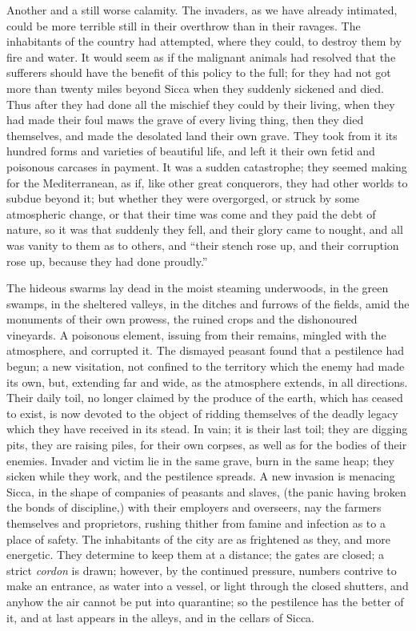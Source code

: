 Another and a still worse calamity. The invaders, as we have
already intimated, could be more terrible still in their overthrow
than in their ravages. The inhabitants of the country had attempted,
where they could, to destroy them by fire and water. It would
seem as if the malignant animals had resolved that the sufferers
should have the benefit of this policy to the full; for they had not
got more than twenty miles beyond Sicca when they suddenly sickened
and died. Thus after they had done all the mischief they could by
their living, when they had made their foul maws the grave of every
living thing, then they died themselves, and made the desolated land
their own grave. They took from it its hundred forms and varieties of
beautiful life, and left it their own fetid and poisonous carcases in
payment. It was a sudden catastrophe; they seemed making for the
Mediterranean, as if, like other great conquerors, they had other
worlds to subdue beyond it; but whether they were overgorged, or
struck by some atmospheric change, or that their time was come and
they paid the debt of nature, so it was that suddenly they fell, and
their glory came to nought, and all was vanity to them as to others,
and ``their stench rose up, and their corruption rose up, because
they had done proudly.''

The hideous swarms lay dead in the moist steaming underwoods, in
the green swamps, in the sheltered valleys, in the ditches and furrows
of the fields, amid the monuments of their own prowess, the ruined
crops and the dishonoured vineyards. A poisonous element, issuing from
their remains, mingled with the atmosphere, and corrupted it. The
dismayed peasant found that a pestilence had begun; a new visitation, not confined to the territory which the enemy had made its
own, but, extending far and wide, as the atmosphere extends, in all
directions. Their daily toil, no longer claimed by the produce of the
earth, which has ceased to exist, is now devoted to the object of
ridding themselves of the deadly legacy which they have received in
its stead. In vain; it is their last toil; they are digging pits, they
are raising piles, for their own corpses, as well as for the bodies of
their enemies. Invader and victim lie in the same grave, burn in the
same heap; they sicken while they work, and the pestilence spreads. A
new invasion is menacing Sicca, in the shape of companies of peasants
and slaves, (the panic having broken the bonds of discipline,) with
their employers and overseers, nay the farmers themselves and
proprietors, rushing thither from famine and infection as to a place
of safety. The inhabitants of the city are as frightened as they, and
more energetic. They determine to keep them at a distance; the gates
are closed; a strict \emph{cordon} is drawn; however, by the continued
pressure, numbers contrive to make an entrance, as water into a
vessel, or light through the closed shutters, and anyhow the air
cannot be put into quarantine; so the pestilence has the better of it,
and at last appears in the alleys, and in the cellars of Sicca.

